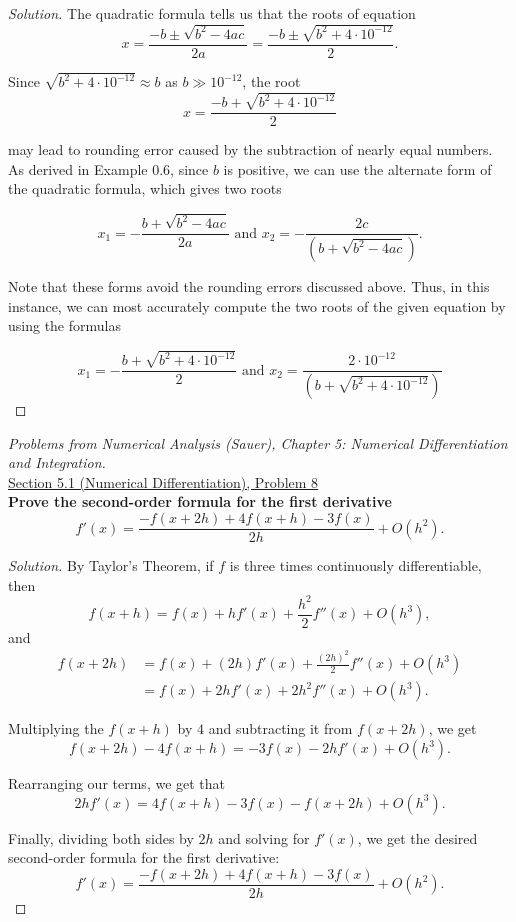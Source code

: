 \documentclass[11pt]{article}
\newenvironment{solution}
  {\renewcommand\qedsymbol{$\blacksquare$}\begin{proof}[Solution]}
  {\end{proof}}
\theoremstyle{definition}
\begin{document}
\begin{solution}
The quadratic formula tells us that the roots of equation \[ x = \frac{-b \pm \sqrt{b^2 -4ac}}{2a} = \frac{-b \pm \sqrt{b^2 + 4\cdot 10^{-12}}}{2}.\]

Since $\sqrt{b^2 + 4 \cdot 10^{-12}} \approx b$ as $b \gg 10^{-12}$, the root \[ x = \frac{-b + \sqrt{b^2 + 4\cdot10^{-12}}}{2} \]

may lead to rounding error caused by the subtraction of nearly equal numbers. \\

As derived in Example 0.6, since $b$ is positive, we can use the alternate form of the quadratic formula, which gives two roots

\[ x_1 = -\frac{b + \sqrt{b^2 - 4ac}}{2a} \text { and  } x_2 = -\frac{2c}{(b + \sqrt{b^2 - 4ac})}. \]

Note that these forms avoid the rounding errors discussed above. Thus, in this instance, we can most accurately compute the two roots of the given equation by using the formulas

\[ \boxed{ x_1 = -\frac{b + \sqrt{b^2 + 4\cdot10^{-12}}}{2} \text { and  } x_2 = \frac{2\cdot 10^{-12}}{(b + \sqrt{b^2 + 4\cdot10^{-12}})} } \]
\end{solution}

\newpage

\textit{Problems from Numerical Analysis (Sauer), Chapter 5: Numerical Differentiation and Integration.} \\

\underline{Section 5.1 (Numerical Differentiation), Problem 8} \\

\textbf{Prove the second-order formula for the first derivative} 
\[ f'(x) = \frac{-f(x+2h) + 4f(x+h) - 3f(x)}{2h} + O(h^2). \]

\begin{solution}
By Taylor's Theorem, if $f$ is three times continuously differentiable, then
\[ f(x+h) = f(x) + hf'(x) + \frac{h^2}{2} f''(x) + O(h^3),\]
and 
\vspace{-0.5cm}
\begin{align*}
    f(x+2h) &= f(x) + (2h)f'(x) + \frac{(2h)^2}{2} f''(x) + O(h^3) \\
    &= f(x) + 2hf'(x) + 2h^2 f''(x) + O(h^3).
\end{align*}

Multiplying the $f(x+h)$ by $4$ and subtracting it from $f(x+2h)$, we get
\[ f(x+2h) - 4f(x+h) = -3f(x) - 2hf'(x) + O(h^3). \]

Rearranging our terms, we get that 
\[ 2hf'(x) = 4f(x+h) - 3f(x) - f(x+2h) + O(h^3). \]

Finally, dividing both sides by $2h$ and solving for $f'(x)$, we get the desired second-order formula for the first derivative:
\[ \boxed{f'(x) = \frac{-f(x+2h) + 4f(x+h) - 3f(x)}{2h} + O(h^2)}. \]
    
\end{solution}
\end{document}
